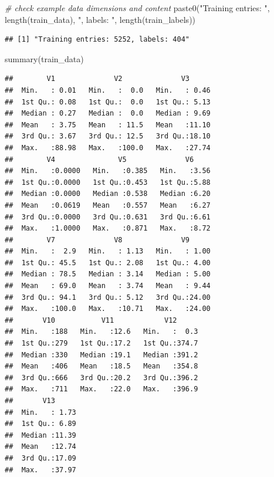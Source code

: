 \documentclass[
  12pt,
]{style/krantz}
\newenvironment{Shaded}{\begin{snugshade}}{\end{snugshade}}
\newcommand{\CommentTok}[1]{\textcolor[rgb]{0.56,0.35,0.01}{\textit{#1}}}
\newcommand{\FunctionTok}[1]{\textcolor[rgb]{0.00,0.00,0.00}{#1}}
\newcommand{\NormalTok}[1]{#1}
\newcommand{\StringTok}[1]{\textcolor[rgb]{0.31,0.60,0.02}{#1}}
\begin{document}
\begin{Shaded}
\begin{Highlighting}[]
\CommentTok{\# check example data dimensions and content}
\FunctionTok{paste0}\NormalTok{(}\StringTok{"Training entries: "}\NormalTok{, }\FunctionTok{length}\NormalTok{(train\_data), }\StringTok{", labels: "}\NormalTok{, }\FunctionTok{length}\NormalTok{(train\_labels))}
\end{Highlighting}
\end{Shaded}

\begin{verbatim}
## [1] "Training entries: 5252, labels: 404"
\end{verbatim}

\begin{Shaded}
\begin{Highlighting}[]
\FunctionTok{summary}\NormalTok{(train\_data)}
\end{Highlighting}
\end{Shaded}

\begin{verbatim}
##        V1              V2              V3       
##  Min.   : 0.01   Min.   :  0.0   Min.   : 0.46  
##  1st Qu.: 0.08   1st Qu.:  0.0   1st Qu.: 5.13  
##  Median : 0.27   Median :  0.0   Median : 9.69  
##  Mean   : 3.75   Mean   : 11.5   Mean   :11.10  
##  3rd Qu.: 3.67   3rd Qu.: 12.5   3rd Qu.:18.10  
##  Max.   :88.98   Max.   :100.0   Max.   :27.74  
##        V4               V5              V6      
##  Min.   :0.0000   Min.   :0.385   Min.   :3.56  
##  1st Qu.:0.0000   1st Qu.:0.453   1st Qu.:5.88  
##  Median :0.0000   Median :0.538   Median :6.20  
##  Mean   :0.0619   Mean   :0.557   Mean   :6.27  
##  3rd Qu.:0.0000   3rd Qu.:0.631   3rd Qu.:6.61  
##  Max.   :1.0000   Max.   :0.871   Max.   :8.72  
##        V7              V8              V9       
##  Min.   :  2.9   Min.   : 1.13   Min.   : 1.00  
##  1st Qu.: 45.5   1st Qu.: 2.08   1st Qu.: 4.00  
##  Median : 78.5   Median : 3.14   Median : 5.00  
##  Mean   : 69.0   Mean   : 3.74   Mean   : 9.44  
##  3rd Qu.: 94.1   3rd Qu.: 5.12   3rd Qu.:24.00  
##  Max.   :100.0   Max.   :10.71   Max.   :24.00  
##       V10           V11            V12       
##  Min.   :188   Min.   :12.6   Min.   :  0.3  
##  1st Qu.:279   1st Qu.:17.2   1st Qu.:374.7  
##  Median :330   Median :19.1   Median :391.2  
##  Mean   :406   Mean   :18.5   Mean   :354.8  
##  3rd Qu.:666   3rd Qu.:20.2   3rd Qu.:396.2  
##  Max.   :711   Max.   :22.0   Max.   :396.9  
##       V13       
##  Min.   : 1.73  
##  1st Qu.: 6.89  
##  Median :11.39  
##  Mean   :12.74  
##  3rd Qu.:17.09  
##  Max.   :37.97
\end{verbatim}
\end{document}

